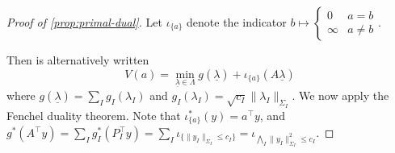 \documentclass{article} %
\begin{document}
\begin{proof}[Proof of \cref{prop:primal-dual}] Let $\iota_{\{a\}}$ denote the indicator $b\mapsto \begin{cases}
    0 & a= b\\
    \infty & a\neq b
\end{cases}$.

Then  is alternatively written
\[
V(a) = \min_{\underline{\lambda}\in\Lambda} g(\underline{\lambda}) + \iota_{\{a\}}(A\underline{\lambda})
\]
where $g(\underline{\lambda})=\sum_I g_I(\lambda_I)$ and $g_I(\lambda_I)=\sqrt{c_I}\|\lambda_I\|_{\Sigma_I}$. We now apply the Fenchel duality theorem. Note that $\iota_{\{a\}}^*(y)=a^\top y$, and $g^*(A^\top y) = \sum_I g_I^*(P_I^\top y) = \sum_I \iota_{\{\|y_I\|_{\Sigma_I}\leq c_I\}} = \iota_{\bigwedge_I \|y_I\|_{\Sigma_I}^2\leq c_I}$.
\end{proof}

\end{document}
